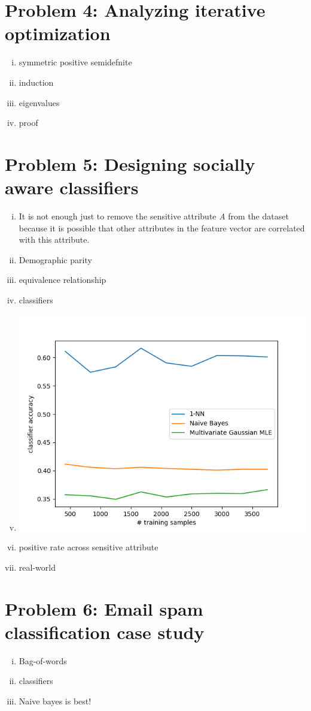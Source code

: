 \documentclass[twoside,11pt]{homework}
\begin{document}
\section*{Problem 4: Analyzing iterative optimization}
\begin{enumerate}[(i)]
	\item symmetric positive semidefnite
	\item induction
	\item eigenvalues
	\item proof
\end{enumerate}

\section*{Problem 5: Designing socially aware classifiers}

\begin{enumerate}[(i)]
	\item It is not enough just to remove the sensitive attribute \emph{A} from the dataset because it is possible that other attributes in the feature vector are correlated with this attribute.
	\item Demographic parity
	\item equivalence relationship
	\item classifiers
	\item \includegraphics[width=\textwidth]{compas.png}
	\item positive rate across sensitive attribute
	\item real-world
\end{enumerate}

\section*{Problem 6: Email spam classification case study}

\begin{enumerate}[(i)]
	\item Bag-of-words
	\item classifiers
	\item Naive bayes is best!
\end{enumerate}
\end{document}
